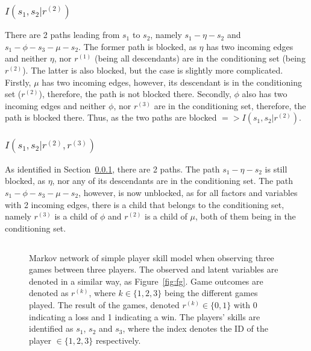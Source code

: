 \documentclass[a4paper,11pt]{article}
\theoremstyle{mytheor}
\begin{document}
\subsubsection{$I(s_1,s_2|r^{(2)})$}
\label{sec:first_indep}
There are 2 paths leading from $s_1$ to $s_2$, namely $s_1-\eta-s_2$ and $s_1-\phi-s_3-\mu-s_2$. The former path is blocked, as $\eta$ has two incoming edges and neither $\eta$, nor $r^{(1)}$ (being all descendants) are in the conditioning set (being $r^{(2)}$). The latter is also blocked, but the case is slightly more complicated. Firstly, $\mu$ has two incoming edges, however, its descendant is in the conditioning set ($r^{(2)}$), therefore, the path is not blocked there. Secondly, $\phi$ also has two incoming edges and neither $\phi$, nor $r^{(3)}$ are in the conditioning set, therefore, the path is blocked there.
Thus, as the two paths are blocked $=> I(s_1,s_2|r^{(2)})$.
\subsubsection{$I(s_1,s_2|r^{(2)},r^{(3)})$}
As identified in Section~\ref{sec:first_indep}, there are 2 paths. The path $s_1-\eta-s_2$ is still blocked, as $\eta$, nor any of its descendants are in the conditioning set. The path $s_1-\phi-s_3-\mu-s_2$, however, is now unblocked, as for all factors and variables with 2 incoming edges, there is a child that belongs to the conditioning set, namely $r^{(3)}$ is a child of $\phi$ and $r^{(2)}$ is a child of $\mu$, both of them being in the conditioning set.

\subsection{}
\begin{figure}[htpb!]
    \centering
    \caption{Markov network of simple player skill model when observing three games between three players. The observed and latent variables are denoted in a similar way, as Figure~\ref{fig:fg}. Game outcomes are denoted as $r^{(k)}$, where $k\in{\{1,2,3\}}$ being the different games played. The result of the games, denoted $r^{(k)}\in{\{0,1\}}$ with 0 indicating a loss and 1 indicating a win. The players' skills are identified as $s_1$, $s_2$ and $s_3$, where the index denotes the ID of the player $\in{\{1,2,3\}}$ respectively.}
    \label{fig:mn}
\end{figure}
\end{document}
